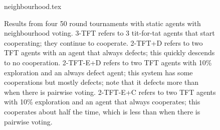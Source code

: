 \begin{figure} [ht]
\begin{center}
 {neighbourhood.tex} 
\end {center}
\caption{Results from four 50 round tournaments with static agents
  with neighbourhood voting.  3-TFT refers to 3 tit-for-tat agents
  that start cooperating; they continue to cooperate.  2-TFT+D refers
  to two TFT agents with an agent that always defects; this
  quickly descends to no cooperation.  2-TFT-E+D refers to two
  TFT agents with 10\% exploration and an always defect agent;
  this system has some cooperations but mostly defects; note that it
  defects more than when there is pairwise voting.  2-TFT-E+C refers
  to two TFT agents with 10\% exploration and an agent that
  always cooperates; this cooperates about half the time, which is
  less than when there is pairwise voting.}
  \label{figStaticOneVote}
\end {figure}
